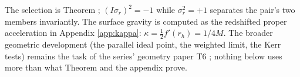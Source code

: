 The selection is Theorem ; $(I\sigma_r)^2 = -1$ while $\sigma_r^2 = +1$ separates the pair's two members invariantly. The surface gravity is computed as the redshifted proper acceleration in Appendix \ref{app:kappa}: $\kappa = \tfrac12 f'(r_h) = 1/4M$. The broader geometric development (the parallel ideal point, the weighted limit, the Kerr tests) remains the task of the series' geometry paper T6 \cite{ButlerT6}; nothing below uses more than what Theorem  and the appendix prove.
